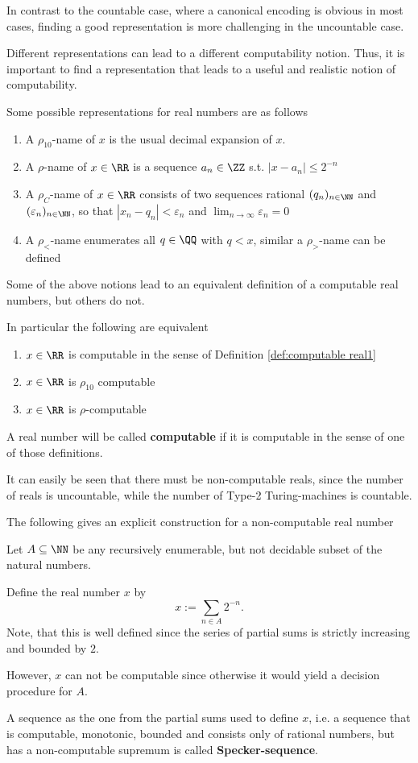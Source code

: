 In contrast to the countable case, where a canonical encoding is obvious in most
cases, finding a good representation is more challenging in the uncountable
case.

Different representations can lead to a different computability notion.
Thus, it is important to find a representation that leads to a useful and
realistic notion of computability.

Some possible representations for real numbers are as follows
\begin{enumerate}
\item A $\rho_{10}$-name of $x$ is the usual decimal expansion of $x$.
\item A $\rho$-name of $x \in \RR$ is a sequence $a_n \in \ZZ$ s.t. $| x - a_n | \leq 2^{-n}$
\item  A $\rho_C$-name of $x \in \RR$ consists of two sequences rational $(q_n)_{n \in \NN}$ and $(\varepsilon_n)_{n \in \NN}$, so that 
$| x_n - q_n | < \varepsilon_n$ and $\lim_{n \to \infty} \varepsilon_n = 0$  
\item A $\rho_<$-name enumerates all $q \in \QQ$ with $q < x$, similar a
  $\rho_>$-name can be defined
\end{enumerate}
Some of the above notions lead to an equivalent definition of a computable real
numbers, but others do not.

In particular the following are equivalent
\begin{enumerate}
  \item $x \in \RR$ is computable in the sense of Definition
    \ref{def:computable real1}
  \item $x \in \RR$ is $\rho_{10}$ computable
  \item $x \in \RR$ is $\rho$-computable
\end{enumerate}
A real number will be called \textbf{computable} if it is computable in the sense of one of
those definitions.

It can easily be seen that there must be non-computable reals, since the number
of reals is uncountable, while the number of Type-2 Turing-machines is
countable.

The following gives an explicit construction for a non-computable real number
\begin{example}
Let $A \subseteq \NN$ be any recursively enumerable, but not decidable subset
of the natural numbers.

Define the real number $x$ by
$$ x := \sum_{n \in A} 2^{-n}. $$
Note, that this is well defined since the series of partial sums is strictly
increasing and bounded by $2$.

However, $x$ can not be computable since otherwise it would yield a decision
procedure for $A$. 
\end{example}
A sequence as the one from the partial sums used to define $x$, i.e. a sequence that is computable, monotonic, bounded and consists
only of rational numbers, but has a non-computable supremum is called \textbf{Specker-sequence}.

